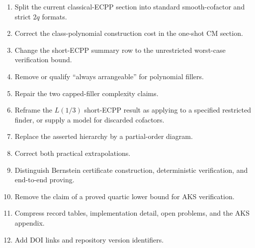 \documentclass[11pt]{amsart}
\begin{document}
\begin{enumerate}
\item Split the current classical-ECPP section into standard smooth-cofactor and strict $2q$ formats.
\item Correct the class-polynomial construction cost in the one-shot CM section.
\item Change the short-ECPP summary row to the unrestricted worst-case verification bound.
\item Remove or qualify ``always arrangeable'' for polynomial fillers.
\item Repair the two capped-filler complexity claims.
\item Reframe the $L(1/3)$ short-ECPP result as applying to a specified restricted finder, or supply a model for discarded cofactors.
\item Replace the asserted hierarchy by a partial-order diagram.
\item Correct both practical extrapolations.
\item Distinguish Bernstein certificate construction, deterministic verification, and end-to-end proving.
\item Remove the claim of a proved quartic lower bound for AKS verification.
\item Compress record tables, implementation detail, open problems, and the AKS appendix.
\item Add DOI links and repository version identifiers.
\end{enumerate}
\end{document}
